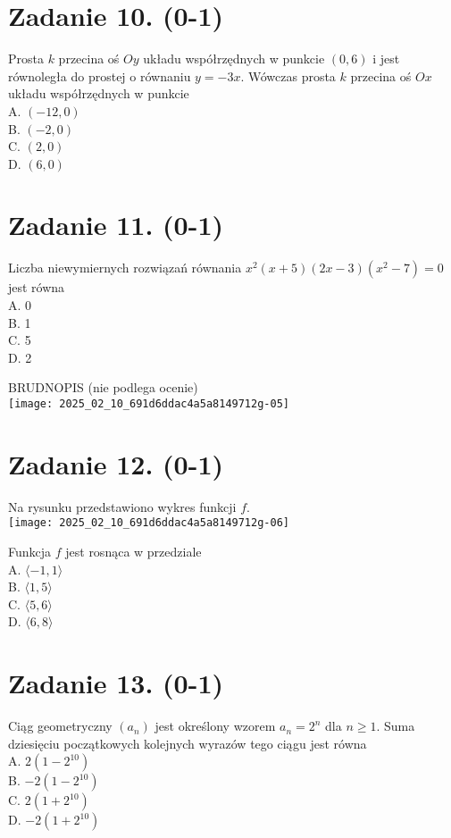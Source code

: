 \documentclass[10pt]{article}
\begin{document}
\section*{Zadanie 10. (0-1)}
Prosta \(k\) przecina oś \(O y\) układu współrzędnych w punkcie \((0,6)\) i jest równoległa do prostej o równaniu \(y=-3 x\). Wówczas prosta \(k\) przecina oś \(O x\) układu współrzędnych w punkcie\\
A. \((-12,0)\)\\
B. \((-2,0)\)\\
C. \((2,0)\)\\
D. \((6,0)\)

\section*{Zadanie 11. (0-1)}
Liczba niewymiernych rozwiązań równania \(x^{2}(x+5)(2 x-3)\left(x^{2}-7\right)=0\) jest równa\\
A. 0\\
B. 1\\
C. 5\\
D. 2

BRUDNOPIS (nie podlega ocenie)\\
\texttt{[image: 2025\_02\_10\_691d6ddac4a5a8149712g-05]}

\section*{Zadanie 12. (0-1)}
Na rysunku przedstawiono wykres funkcji \(f\).\\
\texttt{[image: 2025\_02\_10\_691d6ddac4a5a8149712g-06]}

Funkcja \(f\) jest rosnąca w przedziale\\
A. \(\langle-1,1\rangle\)\\
B. \(\langle 1,5\rangle\)\\
C. \(\langle 5,6\rangle\)\\
D. \(\langle 6,8\rangle\)

\section*{Zadanie 13. (0-1)}
Ciąg geometryczny \(\left(a_{n}\right)\) jest określony wzorem \(a_{n}=2^{n}\) dla \(n \geq 1\). Suma dziesięciu początkowych kolejnych wyrazów tego ciągu jest równa\\
A. \(2\left(1-2^{10}\right)\)\\
B. \(-2\left(1-2^{10}\right)\)\\
C. \(2\left(1+2^{10}\right)\)\\
D. \(-2\left(1+2^{10}\right)\)
\end{document}
